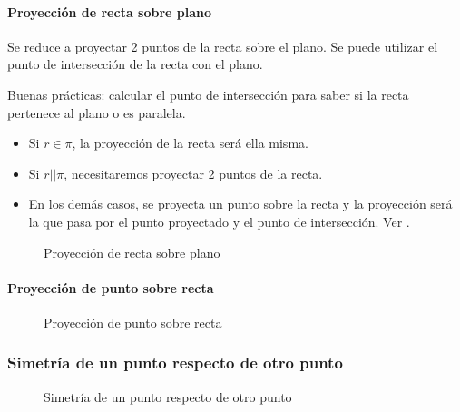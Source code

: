 \paragraph{Proyección de recta sobre plano}

Se reduce a proyectar 2 puntos de la recta sobre el plano. Se puede utilizar el punto de intersección de la recta con el plano.

\obs Buenas prácticas: calcular el punto de intersección para saber si la recta pertenece al plano o es paralela. 
\begin{itemize}
  \item Si $r\in\pi$, la proyección de la recta será ella misma.
  \item Si $r||\pi$, necesitaremos proyectar 2 puntos de la recta.
  \item En los demás casos, se proyecta un punto sobre la recta y la proyección será la que pasa por el punto proyectado y el punto de intersección. Ver .
\end{itemize}


\begin{figure}[hbtp]
\centering
{}

\label{fig::proy::recta-plano}
\caption{Proyección de recta sobre plano}
\end{figure}


\paragraph{Proyección de punto sobre recta}

\begin{figure}[hbtp]
\centering
{}

\label{fig::proy::punto-recta}
\caption{Proyección de punto sobre recta}
\end{figure}


\subsubsection{Simetría de un punto respecto de otro punto}


\begin{figure}[hbtp]
\centering
{}

\label{fig::sim::punto-punto}
\caption{Simetría de un punto respecto de otro punto}
\end{figure}

